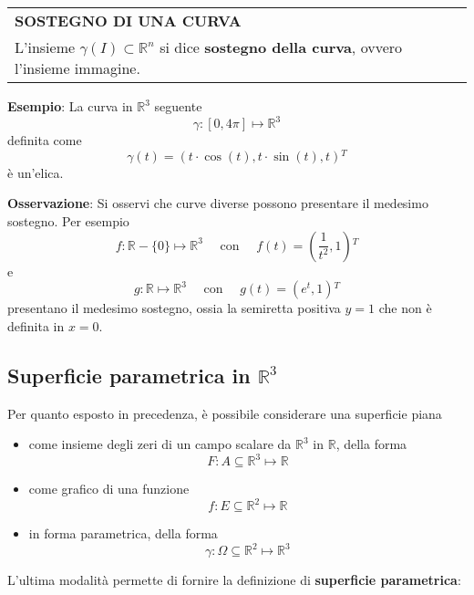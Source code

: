 \documentclass[a4paper]{extarticle}
\renewcommand\arraystretch{}
\begin{document}
\vspace{1em}
\setlength{\tabcolsep}{14pt}
\renewcommand{\arraystretch}{2}
\noindent
\begin{tabularx}{\textwidth}{@{}|P|@{}}
    \hline
    {\textbf{SOSTEGNO DI UNA CURVA}}\\
    \parbox{\linewidth}{L'insieme $\gamma(I) \subset \mathbb{R}^n$ si dice \textbf{sostegno della curva}, ovvero l'insieme immagine. \vspace{3mm}}\\
    \hline
\end{tabularx}

\vspace{1em}
\noindent
\textbf{Esempio}: La curva in $\mathbb{R}^3$ seguente
\[\gamma : [0,4\pi] \longmapsto \mathbb{R}^3\]
definita come
\[\gamma(t) = \left(t \cdot \cos(t),t \cdot \sin(t),t\right){^T}\]
è un'elica.

\vspace{1em}
\noindent
\textbf{Osservazione}: Si osservi che curve diverse possono presentare il medesimo sostegno. Per esempio
\[f : \mathbb{R} - \{0\} \longmapsto \mathbb{R}^3 \hspace{1em} \text{ con } \hspace{1em} f(t)=\left(\frac{1}{t^2},1\right){^T}\]
e
\[g : \mathbb{R} \longmapsto \mathbb{R}^3 \hspace{1em} \text{ con } \hspace{1em} g(t)=\left(e^t,1\right){^T}\]
presentano il medesimo sostegno, ossia la semiretta positiva $y=1$ che non è definita in $x=0$.

\vspace{1em}
\noindent
\subsection{Superficie parametrica in $\mathbb{R}^3$}
Per quanto esposto in precedenza, è possibile considerare una superficie piana
\begin{itemize}
    \item come insieme degli zeri di un campo scalare da $\mathbb{R}^3$ in $\mathbb{R}$, della forma
    \[F : A \subseteq \mathbb{R}^3 \longmapsto \mathbb{R}\]
    \item come grafico di una funzione
    \[f : E \subseteq \mathbb{R}^2 \longmapsto \mathbb{R}\]
    \item in forma parametrica, della forma
    \[\gamma : \Omega \subseteq \mathbb{R}^2 \longmapsto \mathbb{R}^3\]
\end{itemize}
L'ultima modalità permette di fornire la definizione di \textbf{superficie parametrica}:
\end{document}
